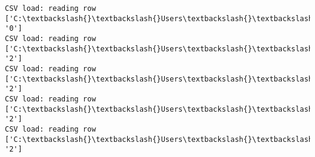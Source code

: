 \documentclass[11pt]{article}
\begin{document}
\begin{Verbatim}[commandchars=\\\{\}]
CSV load: reading row ['C:\textbackslash{}\textbackslash{}Users\textbackslash{}\textbackslash{}AbhishekGangadhar\textbackslash{}\textbackslash{}Downloads\textbackslash{}\textbackslash{}ActionRecog\textbackslash{}\textbackslash{}ActionRecog\textbackslash{}\textbackslash{}DataSets\textbackslash{}\textbackslash{}UCF11\textbackslash{}\textbackslash{}action\_youtube\_naudio\textbackslash{}\textbackslash{}biking\textbackslash{}\textbackslash{}v\_biking\_05\textbackslash{}\textbackslash{}v\_biking\_05\_09.avi', '0']
CSV load: reading row ['C:\textbackslash{}\textbackslash{}Users\textbackslash{}\textbackslash{}AbhishekGangadhar\textbackslash{}\textbackslash{}Downloads\textbackslash{}\textbackslash{}ActionRecog\textbackslash{}\textbackslash{}ActionRecog\textbackslash{}\textbackslash{}DataSets\textbackslash{}\textbackslash{}UCF11\textbackslash{}\textbackslash{}action\_youtube\_naudio\textbackslash{}\textbackslash{}trampoline\_jumping\textbackslash{}\textbackslash{}v\_jumping\_16\textbackslash{}\textbackslash{}v\_jumping\_16\_01.avi', '2']
CSV load: reading row ['C:\textbackslash{}\textbackslash{}Users\textbackslash{}\textbackslash{}AbhishekGangadhar\textbackslash{}\textbackslash{}Downloads\textbackslash{}\textbackslash{}ActionRecog\textbackslash{}\textbackslash{}ActionRecog\textbackslash{}\textbackslash{}DataSets\textbackslash{}\textbackslash{}UCF11\textbackslash{}\textbackslash{}action\_youtube\_naudio\textbackslash{}\textbackslash{}trampoline\_jumping\textbackslash{}\textbackslash{}v\_jumping\_16\textbackslash{}\textbackslash{}v\_jumping\_16\_02.avi', '2']
CSV load: reading row ['C:\textbackslash{}\textbackslash{}Users\textbackslash{}\textbackslash{}AbhishekGangadhar\textbackslash{}\textbackslash{}Downloads\textbackslash{}\textbackslash{}ActionRecog\textbackslash{}\textbackslash{}ActionRecog\textbackslash{}\textbackslash{}DataSets\textbackslash{}\textbackslash{}UCF11\textbackslash{}\textbackslash{}action\_youtube\_naudio\textbackslash{}\textbackslash{}trampoline\_jumping\textbackslash{}\textbackslash{}v\_jumping\_16\textbackslash{}\textbackslash{}v\_jumping\_16\_03.avi', '2']
CSV load: reading row ['C:\textbackslash{}\textbackslash{}Users\textbackslash{}\textbackslash{}AbhishekGangadhar\textbackslash{}\textbackslash{}Downloads\textbackslash{}\textbackslash{}ActionRecog\textbackslash{}\textbackslash{}ActionRecog\textbackslash{}\textbackslash{}DataSets\textbackslash{}\textbackslash{}UCF11\textbackslash{}\textbackslash{}action\_youtube\_naudio\textbackslash{}\textbackslash{}trampoline\_jumping\textbackslash{}\textbackslash{}v\_jumping\_16\textbackslash{}\textbackslash{}v\_jumping\_16\_04.avi', '2']

\end{Verbatim}
\end{document}
